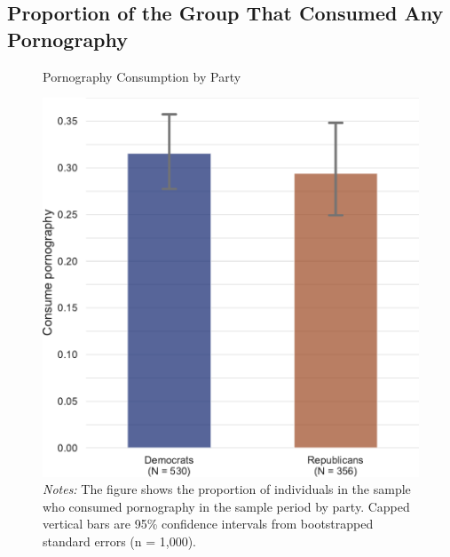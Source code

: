 \documentclass[12pt, letterpaper]{article}
\begin{document}
\subsection{Proportion of the Group That Consumed Any Pornography}
\begin{figure}[ht]
	\centering
	\caption{Pornography Consumption by Party}
	\includegraphics[width=.5\textwidth]{figs/consume_porn_yes_no.pdf}
	\caption*{\footnotesize \emph{Notes:} 
		The figure shows the proportion of individuals in the sample who consumed pornography in the sample period by party.
		Capped vertical bars are 95\% confidence intervals from bootstrapped standard errors (n = 1,000).
	}
	\label{fig:consume_porn_yes_no}
\end{figure}
\clearpage

\FloatBarrier
\end{document}
